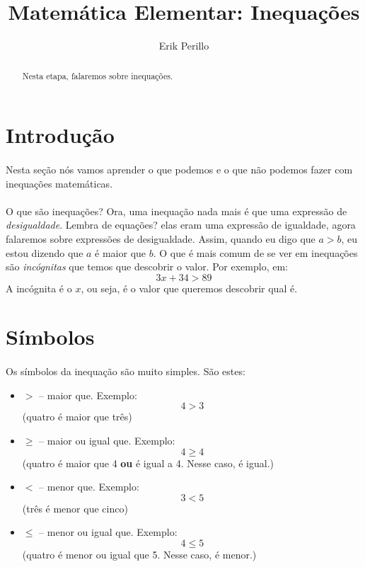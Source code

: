 \documentclass[11pt]{article}
\begin{document}
\title{Matemática Elementar: Inequações}
\author{Erik Perillo}
\date{}
\maketitle
\begin{abstract}
Nesta etapa, falaremos sobre inequações.
\end{abstract}

\newpage

\tableofcontents

\newpage

\section{Introdução}
\paragraph{}
Nesta seção nós vamos aprender o que podemos e o que não podemos fazer com
inequações matemáticas. 
\paragraph{}
O que são inequações? Ora, uma inequação nada mais é que uma expressão de
\emph{desigualdade}. Lembra de equações? elas eram uma expressão de igualdade,
agora falaremos sobre expressões de desigualdade.
Assim, quando eu digo que $a > b$, eu estou dizendo que $a$ é maior que $b$.
O que é mais comum de se ver em inequações são \emph{incógnitas} que temos que 
descobrir o valor. Por exemplo, em: 
$$3x + 34 > 89$$
A incógnita é o $x$, ou seja, é o valor que queremos descobrir qual é. 

\section{Símbolos}
\paragraph{}
Os símbolos da inequação são muito simples. São estes:
\begin{itemize}
	\item $>$ -- maior que. Exemplo:
		  $$4 > 3$$
		  (quatro é maior que três)
	\item $\geq$ -- maior ou igual que. Exemplo:
		  $$4 \geq 4$$
		  (quatro é maior que 4 \textbf{ou} é igual a 4. Nesse caso, é igual.)
	\item $<$ -- menor que. Exemplo:
		  $$3 < 5$$
		  (três é menor que cinco)
	\item $\leq$ -- menor ou igual que. Exemplo:
		  $$4 \leq 5$$
		  (quatro é menor ou igual que 5. Nesse caso, é menor.)
\end{itemize}
\end{document}

